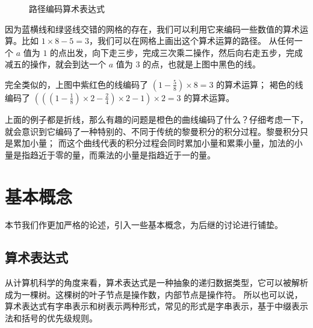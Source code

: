 \documentclass[a4paper,12pt]{book}
\numberwithin{problem}{section}
\numberwithin{definition}{section}
\numberwithin{lemma}{section}
\numberwithin{proposition}{section}
\numberwithin{theorem}{section}
\numberwithin{grammar}{section}
\numberwithin{program}{section}
\numberwithin{convention}{section}
\numberwithin{corollary}{section}
\begin{document}
\begin{figure}[ht]\centering
{}
\caption{路径编码算术表达式}\label{fig:encoding}
\end{figure}

因为蓝横线和绿竖线交错的网格的存在，我们可以利用它来编码一些数值的算术运算。比如 $1 \times 8 - 5 = 3$，我们可以在网格上画出这个算术运算的路径。
从任何一个 $a$ 值为 $1$ 的点出发，向下走三步，完成三次乘二操作，然后向右走五步，完成减五的操作，就会到达一个 $a$ 值为 $3$ 的点，也就是上图中黑色的线。

完全类似的，上图中紫红色的线编码了 $(1 - \frac{5}{8}) \times 8 = 3$ 的算术运算；
褐色的线编码了 $(((1 - \frac{1}{8}) \times 2 - \frac{2}{4}) \times 2 - 1) \times 2 = 3$ 的算术运算。

上面的例子都是折线，那么有趣的问题是橙色的曲线编码了什么？仔细考虑一下，就会意识到它编码了一种特别的、不同于传统的黎曼积分的积分过程。黎曼积分只是累加小量；
而这个曲线代表的积分过程会同时累加小量和累乘小量，加法的小量是指趋近于零的量，而乘法的小量是指趋近于一的量。

\newpage

\chapter{基本概念}

本节我们作更加严格的论述，引入一些基本概念，为后继的讨论进行铺垫。

\section{算术表达式}

从计算机科学的角度来看，算术表达式是一种抽象的递归数据类型，它可以被解析成为一棵树。这棵树的叶子节点是操作数，内部节点是操作符。
所以也可以说，算术表达式有字串表示和树表示两种形式，常见的形式是字串表示，基于中缀表示法和括号的优先级规则。
\end{document}

